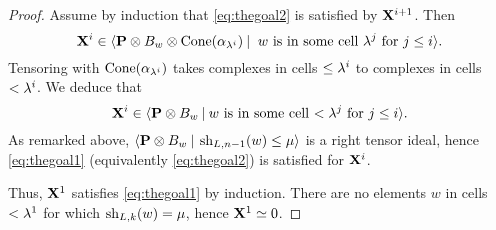 \begin{proof}
Assume by induction that \eqref{eq:thegoal2} is satisfied by ${\mathbf X}^{i+1}$.  Then
\[
{\mathbf X}^i\in\langle {\mathbf P}\otimes B_w\otimes \operatorname{Cone}(\alpha_{\lambda^i})\:|\: \text{ $w$ is in some cell $\lambda^j$ for $j \le i$}\rangle.
\]
Tensoring with $\operatorname{Cone}(\alpha_{\lambda^i})$ takes complexes  in cells $\le \lambda^i$ to complexes in cells $< \lambda^i$. We deduce that
\[
{\mathbf X}^i\in\langle {\mathbf P}\otimes B_w\:|\: \text{$w$ is in some cell $<\lambda^j$ for $j \le i$}\rangle.
\]
As remarked above, $\langle {\mathbf P}\otimes B_w\:|\: \operatorname{sh}_{L,n-1}(w)\leq \mu\rangle$  is a right tensor ideal, hence \eqref{eq:thegoal1} (equivalently \eqref{eq:thegoal2}) is satisfied for ${\mathbf X}^i$. 

Thus, ${\mathbf X}^1$ satisfies \eqref{eq:thegoal1} by induction. There are no elements $w$ in cells $< \lambda^1$ for which $\operatorname{sh}_{L,k}(w) = \mu$, hence ${\mathbf X}^1 \simeq 0$.  \end{proof}




